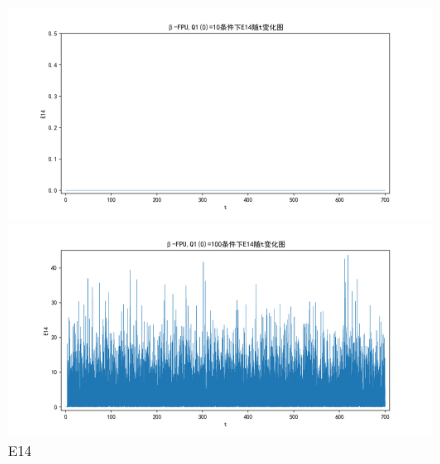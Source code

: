 \documentclass[10pt, a4paper]{article}
\begin{document}
    \begin{figure}[H]
        \begin{minipage}[t]{0.49\textwidth}
            \centering
            \includegraphics[width=\textwidth]{./q6_pics/cmp/E14.png}
        \end{minipage}
        \begin{minipage}[t]{0.49\textwidth}
            \centering
            \includegraphics[width=\textwidth]{./q6_pics/exp/E14.png}
        \end{minipage}
        \caption{E14}\label{fig:E14 in q6}
    \end{figure}
\end{document}
